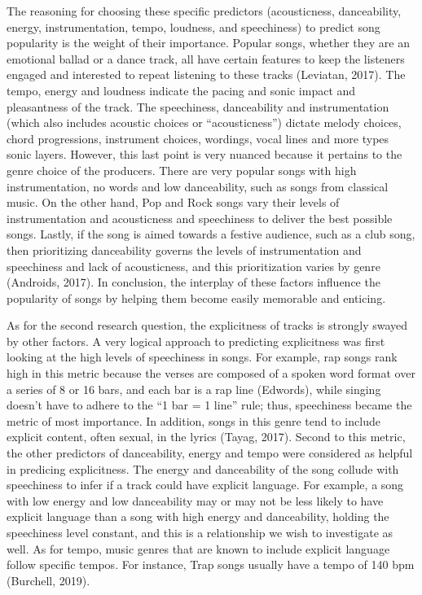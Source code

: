 \documentclass[
]{article}
\begin{document}
The reasoning for choosing these specific predictors (acousticness,
danceability, energy, instrumentation, tempo, loudness, and speechiness)
to predict song popularity is the weight of their importance. Popular
songs, whether they are an emotional ballad or a dance track, all have
certain features to keep the listeners engaged and interested to repeat
listening to these tracks (Leviatan, 2017). The tempo, energy and
loudness indicate the pacing and sonic impact and pleasantness of the
track. The speechiness, danceability and instrumentation (which also
includes acoustic choices or ``acousticness'') dictate melody choices,
chord progressions, instrument choices, wordings, vocal lines and more
types sonic layers. However, this last point is very nuanced because it
pertains to the genre choice of the producers. There are very popular
songs with high instrumentation, no words and low danceability, such as
songs from classical music. On the other hand, Pop and Rock songs vary
their levels of instrumentation and acousticness and speechiness to
deliver the best possible songs. Lastly, if the song is aimed towards a
festive audience, such as a club song, then prioritizing danceability
governs the levels of instrumentation and speechiness and lack of
acousticness, and this prioritization varies by genre (Androids, 2017).
In conclusion, the interplay of these factors influence the popularity
of songs by helping them become easily memorable and enticing.

As for the second research question, the explicitness of tracks is
strongly swayed by other factors. A very logical approach to predicting
explicitness was first looking at the high levels of speechiness in
songs. For example, rap songs rank high in this metric because the
verses are composed of a spoken word format over a series of 8 or 16
bars, and each bar is a rap line (Edwords), while singing doesn't have
to adhere to the ``1 bar = 1 line'' rule; thus, speechiness became the
metric of most importance. In addition, songs in this genre tend to
include explicit content, often sexual, in the lyrics (Tayag, 2017).
Second to this metric, the other predictors of danceability, energy and
tempo were considered as helpful in predicing explicitness. The energy
and danceability of the song collude with speechiness to infer if a
track could have explicit language. For example, a song with low energy
and low danceability may or may not be less likely to have explicit
language than a song with high energy and danceability, holding the
speechiness level constant, and this is a relationship we wish to
investigate as well. As for tempo, music genres that are known to
include explicit language follow specific tempos. For instance, Trap
songs usually have a tempo of 140 bpm (Burchell, 2019).
\end{document}
